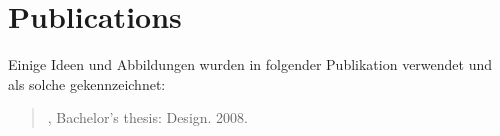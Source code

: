 \chapter*{Publications}
Einige Ideen und Abbildungen wurden in folgender Publikation verwendet und als solche gekennzeichnet:

\bigskip

\noindent \begin{quote}, Bachelor’s thesis: Design. 2008.\end{quote}